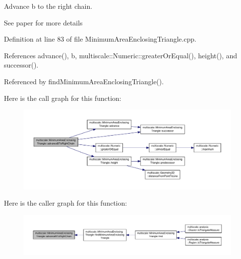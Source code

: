 Advance b to the right chain. 

See paper for more details 

Definition at line 83 of file Minimum\-Area\-Enclosing\-Triangle.\-cpp.



References advance(), b, multiscale\-::\-Numeric\-::greater\-Or\-Equal(), height(), and successor().



Referenced by find\-Minimum\-Area\-Enclosing\-Triangle().



Here is the call graph for this function\-:\nopagebreak
\begin{figure}[H]
\begin{center}
\leavevmode
\includegraphics[width=350pt]{classmultiscale_1_1MinimumAreaEnclosingTriangle_a772ac3b9529eccbce7af2c72a0360d89_cgraph}
\end{center}
\end{figure}




Here is the caller graph for this function\-:\nopagebreak
\begin{figure}[H]
\begin{center}
\leavevmode
\includegraphics[width=350pt]{classmultiscale_1_1MinimumAreaEnclosingTriangle_a772ac3b9529eccbce7af2c72a0360d89_icgraph}
\end{center}
\end{figure}


